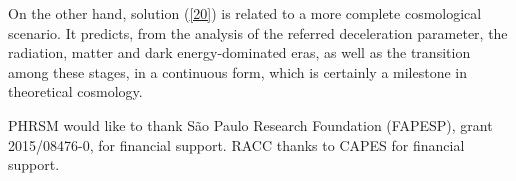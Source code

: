 On the other hand, solution (\ref{20}) is related to a more complete cosmological scenario. It predicts, from the analysis of the referred deceleration parameter, the radiation, matter and dark energy-dominated eras, as well as the transition among these stages, in a continuous form, which is certainly a milestone in theoretical cosmology.

\begin{acknowledgements}
PHRSM would like to thank S\~ao Paulo Research Foundation (FAPESP), grant 2015/08476-0, for financial support. RACC thanks to  CAPES for financial support.
\end{acknowledgements}






